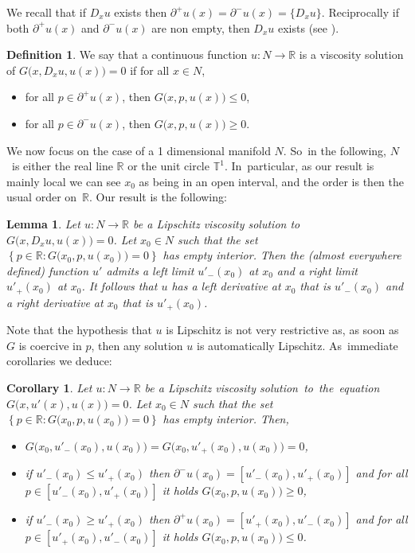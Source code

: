 \documentclass[10pt]{amsart}
\newtheorem{cor}[thm]{Corollary}
\newtheorem{lem}[thm]{Lemma}
\theoremstyle{definition}
\newtheorem{defn}[thm]{Definition}
\newcommand{\R}{\mathbb{R}}
\begin{document}
\begin{appendix}
We recall that if $D_x u$ exists then $\partial^+u(x)=\partial^-u(x) = \{D_xu\}$. Reciprocally if both $\partial^+u(x)$ and $\partial^-u(x)$ are non empty, then $D_x u$ exists (see \cite{CanSin04}).

\begin{defn}\rm
We say that a continuous function $u :N\to \R$ is a viscosity solution of $G\bigl(x,D_x u , u(x)\bigr) = 0$ if for all $x\in N$,
\begin{itemize}
\item for all $p\in \partial^+u(x)$, then $G\bigl(x,p,u(x)\bigr) \leqslant 0$,
\item for all $p\in \partial^-u(x)$, then $G\bigl(x,p,u(x)\bigr) \geqslant 0$.
\end{itemize}
\end{defn}

We now focus on the case of a 1 dimensional manifold $N$. So~in the following, $N$~is either the real line $\R$ or the unit circle $\mathbb{T}^1$. In~particular, as our result is mainly local we can see $x_0$ as being in an open interval, and the order is then the usual order on~$\R$. Our result is the following:

\begin{lem}\label{main-lemma}
Let $u : N\!\to\! \R$ be a Lipschitz viscosity solution to \hbox{$G\bigl(x,D_x u , u(x)\bigr) \!=\! 0$}. Let $x_0\in N$ such that the set $\left\{p\in \R: G\bigl(x_0,p,u(x_0)\bigr) = 0\right\}$ has empty interior. Then the (almost everywhere defined) function $u'$ admits a left limit $u'_-(x_0)$ at $x_0$ and a right limit $u'_+(x_0)$ at $x_0$. It follows that $u$ has a left derivative at $x_0$ that is $u'_-(x_0)$ and a right derivative at $x_0$ that is $u'_+(x_0)$.
\end{lem}
Note that the hypothesis that $u$ is Lipschitz is not very restrictive as, as soon as $G$ is coercive in $p$, then any solution $u$ is automatically Lipschitz. As~immediate corollaries we deduce:
\begin{cor}\label{cormax}
Let $u : N\to \R$ be a Lipschitz viscosity \hbox{solution to the equation} $G\bigl(x,u'(x) , u(x)\bigr) = 0$. Let $x_0\in N$ such that the set $\left\{p\in \R: G\bigl(x_0,p,u(x_0)\bigr) = 0\right\}$ has empty interior. Then,
\begin{itemize}
\setlength{\itemindent}{.8\parindent}
\item\!$G(x_0,u'_-(x_0),u(x_0)\bigr) = G(x_0,u'_+(x_0),u(x_0)\bigr)=0$,
\item\!if $ u'_-(x_0)\!\leqslant\! u'_+(x_0)$ then $\partial^-u(x_0) \!=\! [ u'_-(x_0) , u'_+(x_0)]$ and for all $p\!\in\! [ u'_-(x_0) , u'_+(x_0)]$ it holds $G(x_0,p,u(x_0)\bigr)\geqslant 0$,
\item\!if $ u'_-(x_0)\!\geqslant\! u'_+(x_0)$ then $\partial^+u(x_0) \!=\! [ u'_+(x_0) , u'_-(x_0)]$ and for all $p\!\in\! [ u'_+(x_0) , u'_-(x_0)]$ it holds $G(x_0,p,u(x_0)\bigr)\leqslant 0$.
\end{itemize}
\end{cor}


\end{appendix}
\end{document}
